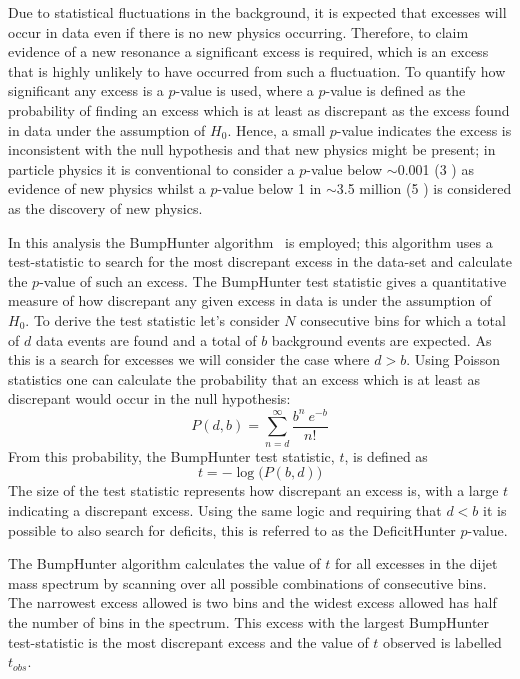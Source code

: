 Due to statistical fluctuations in the background,
it is expected that excesses will occur in data even if there is no new physics occurring.
Therefore, to claim evidence of a new resonance a significant excess is required,
which is an excess that is highly unlikely to have occurred from such a fluctuation.
To quantify how significant any excess is a \mbox{$p$-value} is used,
where a \mbox{$p$-value} is defined as the probability of finding an excess which is at least as discrepant as the excess found in data
under the assumption of $H_0$.
Hence, a small \mbox{$p$-value} indicates the excess is inconsistent with the null hypothesis and that new physics might be present;
in particle physics it is conventional to consider a \mbox{$p$-value} below $\sim$0.001 (3 \sigma) as evidence of new physics
whilst a \mbox{$p$-value} below 1 in $\sim$3.5 million (5 \sigma) is considered as the discovery of new physics.

In this analysis the {\sc BumpHunter} algorithm~\cite{dibjet-bh} is employed;
this algorithm uses a test-statistic to 
search for the most discrepant excess in the data-set
and calculate the \mbox{$p$-value} of such an excess.
The BumpHunter test statistic gives a quantitative measure of how discrepant any given excess in data is
under the assumption of $H_0$.
To derive the test statistic let's consider $N$ consecutive bins for which
a total of $d$ data events are found and a total of $b$ background events are expected.
As this is a search for excesses we will consider the case where $d > b$.
Using Poisson statistics one can calculate the probability that an excess which is at least as discrepant
would occur in the null hypothesis:
\begin{equation}
  P(d,b) = \sum_{n=d}^{\infty} \frac{b^n~e^{-b}}{n!}
\end{equation}
From this probability, the BumpHunter test statistic, $t$, is defined as
\begin{equation}
 t = -\log{\big(P(b,d)\big)}
\end{equation}
The size of the test statistic represents how discrepant an excess is,
with a large $t$ indicating a discrepant excess.
Using the same logic and requiring that $d < b$ it is possible to also search for deficits,
this is referred to as the DeficitHunter \mbox{$p$-value}.

The BumpHunter algorithm calculates the value of $t$ for all excesses in the dijet mass spectrum
by scanning over all possible combinations of consecutive bins.
The narrowest excess allowed is two bins and the widest excess allowed has half the number of bins in the spectrum.
This excess with the largest BumpHunter test-statistic is the most discrepant excess and the value of $t$ observed is labelled $t_{obs}$.

